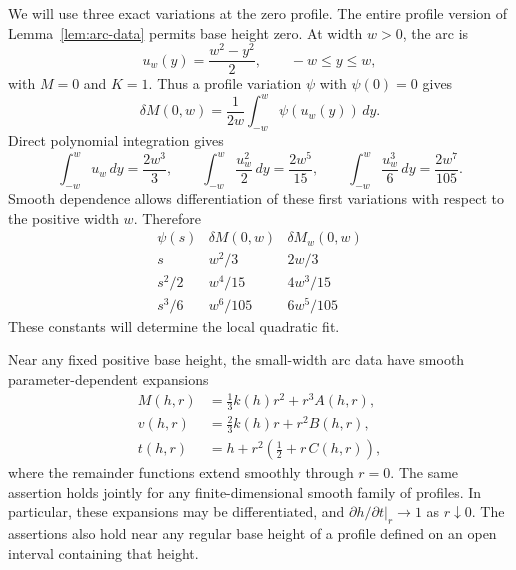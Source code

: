 We will use three exact variations at the zero profile. The entire
profile version of Lemma~\ref{lem:arc-data} permits base height zero.
At width \(w>0\), the arc is
\[
  u_w(y)=\frac{w^2-y^2}{2},\qquad -w\le y\le w,
\]
with \(M=0\) and \(K=1\). Thus a profile variation \(\psi\) with
\(\psi(0)=0\) gives
\[
  \delta M(0,w)=\frac1{2w}\int_{-w}^{w}\psi(u_w(y))\,dy.
\]
Direct polynomial integration gives
\[
 \int_{-w}^{w}u_w\,dy=\frac{2w^3}{3},\qquad
 \int_{-w}^{w}\frac{u_w^2}{2}\,dy=\frac{2w^5}{15},\qquad
 \int_{-w}^{w}\frac{u_w^3}{6}\,dy=\frac{2w^7}{105}.
\]
Smooth dependence allows differentiation of these first variations
with respect to the positive width \(w\). Therefore
\begin{equation}\label{eq:parabolic-variations}
\begin{array}{c|cc}
  \psi(s)&\delta M(0,w)&\delta M_w(0,w)\\ \hline
  s&w^2/3&2w/3\\
  s^2/2&w^4/15&4w^3/15\\
  s^3/6&w^6/105&6w^5/105
\end{array}
\end{equation}
These constants will determine the local quadratic fit.

\begin{lemma}\label{lem:arc-scaling}
Near any fixed positive base height, the small-width arc data have
smooth parameter-dependent expansions
\begin{equation}\label{eq:arc-small-width}
\begin{aligned}
  M(h,r)&=\frac13 k(h)r^2+r^3 A(h,r),\\
  v(h,r)&=\frac23 k(h)r+r^2 B(h,r),\\
  t(h,r)&=h+r^2\left(\frac12+r\,C(h,r)\right),
\end{aligned}
\end{equation}
where the remainder functions extend smoothly through \(r=0\).
The same assertion holds jointly for any finite-dimensional smooth
family of profiles. In particular, these expansions may be
differentiated, and \(\left.\partial h/\partial t\right|_r\to1\)
as \(r\downarrow0\).
The assertions also hold near any regular base height of a profile
defined on an open interval containing that height.
\end{lemma}

